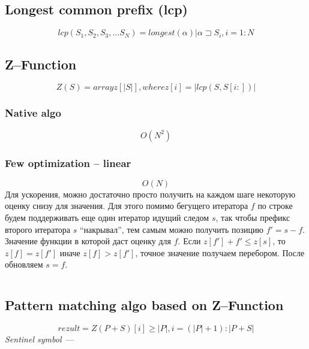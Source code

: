 \documentclass{article}
\begin{document}
\subsection{Longest common prefix (lcp)}
$$
    lcp(S_1, S_2, S_3, \ldots S_N) = longest(\alpha) | \alpha \sqsupset S_i, i = 1:N
$$

\subsection{Z--Function}
$$
    Z(S) = array z[|S|], where z[i] = |lcp(S, S[i:])|
$$

\subsubsection{Native algo}
$$
    O(N^2)
$$

\subsubsection{Few optimization -- linear}
$$
    O(N)
$$
Для ускорения, можно достаточно просто получить на каждом шаге некоторую оценку
снизу для значения. Для этого помимо бегущего итератора $f$ по строке будем
поддерживать еще один итератор идущий следом $s$, так чтобы префикс второго
итератора $s$ ``накрывал'', тем самым можно получить позицию $f' = s - f$.
Значение функции в которой даст оценку для $f$. Если $z[f'] + f' \leq z[s]$, то
$z[f] = z[f']$ иначе $z[f] > z[f']$, точное значение получаем перебором. После
обновляем $s = f$.

\begin{lstlisting}

\end{lstlisting}

\subsection{Pattern matching algo based on Z--Function}
$$
    rezult = Z(P + S)[i] \geq |P|, i = (|P| + 1) : |P + S|
$$
\textit{Sentinel symbol}~---
\end{document}
